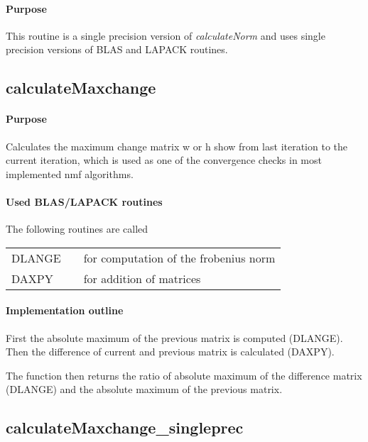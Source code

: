 \documentclass[a4paper,10pt]{scrartcl}
\begin{document}
			\paragraph{Purpose}

			This routine is a single precision version of \emph{calculateNorm} and uses single precision versions
			of BLAS and LAPACK routines.


		\subsection{calculateMaxchange}


			\paragraph{Purpose}

			Calculates the maximum change matrix w or h show from last iteration to the current 
			iteration, which is used as one of the convergence checks in most implemented nmf algorithms.

			\paragraph{Used BLAS/LAPACK routines}

			The following routines are called\newline

			\begin{tabular}{lcl}
				DLANGE && for computation of the frobenius norm\\
				DAXPY && for addition of matrices\\
			\end{tabular}

			\paragraph{Implementation outline}

			First the absolute maximum of the previous matrix is computed (DLANGE). Then the difference
			of current and previous matrix is calculated (DAXPY).\newline

			The function then returns the ratio of absolute maximum of the difference matrix (DLANGE) and
			the absolute maximum of the previous matrix.\newline


		\subsection{calculateMaxchange\_singleprec}
\end{document}
